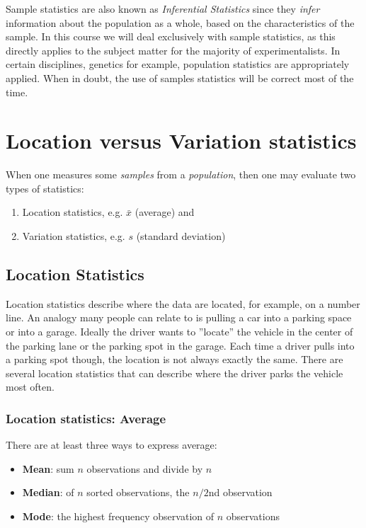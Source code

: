 Sample statistics are also known as \textsl{Inferential Statistics} since they \textsl{infer} information about the population as a whole, based on the characteristics of the sample.  In this course we will deal exclusively with sample statistics, as this directly applies to the subject matter for the majority of experimentalists.  In certain disciplines, genetics for example, population statistics are appropriately applied.  When in doubt, the use of samples statistics will be correct most of the time.

\section{Location versus Variation statistics}

When one measures some \textsl{samples} from a \textsl{population}, then one may evaluate two types of statistics:

\begin{enumerate}
\item Location statistics, e.g. $ \bar{x} $ (average) and
\item Variation statistics, e.g. $ s $ (standard deviation)
\end{enumerate}
\subsection{Location Statistics}

Location statistics describe where the data are located, for example, on a number line.  An analogy many people can relate to is pulling a car into a parking space or into a garage.  Ideally the driver wants to ''locate'' the vehicle in the center of the parking lane or the parking spot in the garage.  Each time a driver pulls into a parking spot though, the location is not always exactly the same. There are several location statistics that can describe where the driver parks the vehicle most often.

\subsubsection{Location statistics: Average}

 
 There are at least three ways to express average:
\begin{itemize}
  \item \textbf{Mean}:	sum $ n $ observations and divide by $ n $
  \item \textbf{Median}:	of $ n $ sorted observations, the $ n/2 $nd observation
  \item \textbf{Mode}:	the highest frequency observation of $ n $ observations
\end{itemize}

